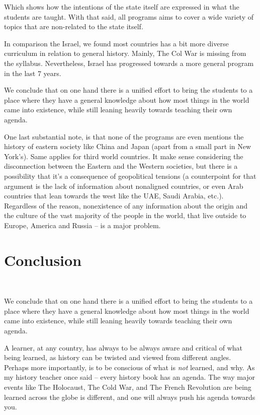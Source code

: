 \documentclass[12pt]{../../../tex/classes/styledArticle}
\newcommand\aftertitle{\ \!\!\!\!\!\!\!\!\!\!}
\begin{document}
	Which shows how the intentions of the state itself are expressed in what the students are taught. With that said, all programs aims to cover a wide variety of topics that are non-related to the state itself. 
	
	In comparison the Israel, we found most countries has a bit more diverse curriculum in relation to general history. Mainly, The Col War is missing from the syllabus. Nevertheless, Israel has progressed towards a more general program in the last 7 years. 
	
	We conclude that on one hand there is a unified effort to bring the students to a place where they have a general knowledge about how most things in the world came into existence, while still leaning heavily towards teaching their own agenda. 
	
	One last substantial note, is that none of the programs are even mentions the history of eastern society like China and Japan (apart from a small part in New York's). Same applies for third world countries. It make sense considering the disconnection between the Eastern and the Western societies, but there is a possibility that it's a consequence of geopolitical tensions (a counterpoint for that argument is the lack of information about nonaligned countries, or even Arab countries that lean towards the west like the UAE, Saudi Arabia, etc.). Regardless of the reason, nonexistence of any information about the origin and the culture of the vast majority of the people in the world, that live outside to Europe, America and Russia -- is a major problem. 
	
	\section{Conclusion}\aftertitle

	\gothstart We conclude that on one hand there is a unified effort to bring the students to a place where they have a general knowledge about how most things in the world came into existence, while still leaning heavily towards teaching their own agenda. 
	
	A learner, at any country, has always to be always aware and critical of what being learned, as history can be twisted and viewed from different angles. Perhaps more importantly, is to be conscious of what is \textit{not} learned, and why. As my history teacher once said -- every history book has an agenda. The way major events like The Holocaust, The Cold War, and The French Revolution are being learned across the globe is different, and one will always push his agenda towards you. 
	
\end{document}
